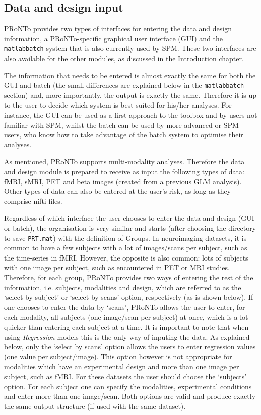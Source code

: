\subsection{Data and design input}

PRoNTo provides two types of interfaces for entering the data and design information, a PRoNTo-specific graphical user interface (GUI) and the  {\tt matlabbatch} system that is also currently used by SPM. These two interfaces are also available for the other modules, as discussed in the Introduction chapter.

The information that needs to be entered is almost exactly the same for both the GUI and batch (the small differences are explained below in the  {\tt matlabbatch} section) and, more importantly, the output is exactly the same. Therefore it is up to the user to decide which system is best suited for his/her analyses. For instance, the GUI can be used as a first approach to the toolbox and by users not familiar with SPM, whilst the batch can be used by more advanced or SPM users, who know how to take advantage of the batch system to optimise their analyses.

As mentioned, PRoNTo supports multi-modality analyses. Therefore the data and design module is prepared to receive as input the following types of data: fMRI, sMRI, PET and beta images (created from a previous GLM analysis). Other types of data can also be entered at the user's risk, as long as they comprise nifti files.

Regardless of which interface the user chooses to enter the data and design (GUI or batch), the organisation is very similar and starts (after choosing the directory to save {\tt PRT.mat}) with the definition of Groups. In neuroimaging datasets, it is common to have a few subjects with a lot of images/scans per subject, such as the time-series in fMRI. However, the opposite is also common: lots of subjects with one image per subject, such as encountered in PET or MRI studies. Therefore, for each group, PRoNTo provides two ways of entering the rest of the information, i.e. subjects, modalities and design, which are referred to as the `select by subject' or `select by scans' option, respectively (as is shown below). If one chooses to enter the data by `scans', PRoNTo allows the user to enter, for each modality, all subjects (one image/scan per subject) at once, which is a lot quicker than entering each subject at a time. It is important to note that when using \textit{Regression} models this is the only way of inputing the data. As explained below, only the `select by scans' option allows the users to enter regression values (one value per subject/image). This option however is not appropriate for modalities which have an experimental design and more than one image per subject, such as fMRI. For these datasets the user should choose the `subjects' option. For each subject one can specify the modalities, experimental conditions and enter more than one image/scan. Both options are valid and produce exactly the same output structure (if used with the same dataset). 

